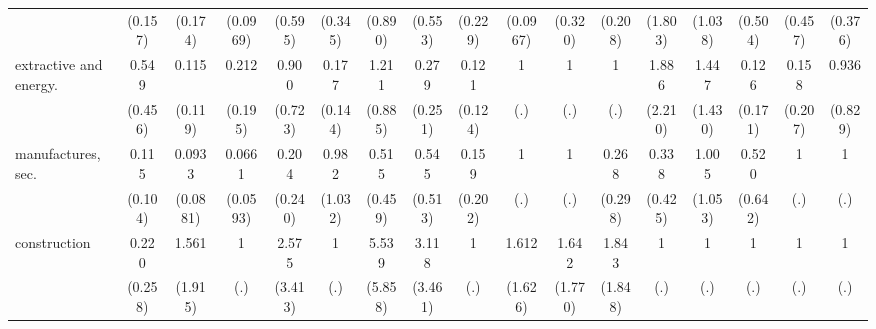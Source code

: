 {\begin{tabular}{l*{16}{c}}
                    &     (0.157)         &     (0.174)         &    (0.0969)         &     (0.595)         &     (0.345)         &     (0.890)         &     (0.553)         &     (0.229)         &    (0.0967)         &     (0.320)         &     (0.208)         &     (1.803)         &     (1.038)         &     (0.504)         &     (0.457)         &     (0.376)         \\
[1em]
extractive and energy.&       0.549         &       0.115\sym{*}  &       0.212         &       0.900         &       0.177\sym{*}  &       1.211         &       0.279         &       0.121\sym{*}  &           1         &           1         &           1         &       1.886         &       1.447         &       0.126         &       0.158         &       0.936         \\
                    &     (0.456)         &     (0.119)         &     (0.195)         &     (0.723)         &     (0.144)         &     (0.885)         &     (0.251)         &     (0.124)         &         (.)         &         (.)         &         (.)         &     (2.210)         &     (1.430)         &     (0.171)         &     (0.207)         &     (0.829)         \\
[1em]
manufactures, sec.  &       0.115\sym{*}  &      0.0933\sym{*}  &      0.0661\sym{**} &       0.204         &       0.982         &       0.515         &       0.545         &       0.159         &           1         &           1         &       0.268         &       0.338         &       1.005         &       0.520         &           1         &           1         \\
                    &     (0.104)         &    (0.0881)         &    (0.0593)         &     (0.240)         &     (1.032)         &     (0.459)         &     (0.513)         &     (0.202)         &         (.)         &         (.)         &     (0.298)         &     (0.425)         &     (1.053)         &     (0.642)         &         (.)         &         (.)         \\
[1em]
construction        &       0.220         &       1.561         &           1         &       2.575         &           1         &       5.539         &       3.118         &           1         &       1.612         &       1.642         &       1.843         &           1         &           1         &           1         &           1         &           1         \\
                    &     (0.258)         &     (1.915)         &         (.)         &     (3.413)         &         (.)         &     (5.858)         &     (3.461)         &         (.)         &     (1.626)         &     (1.770)         &     (1.848)         &         (.)         &         (.)         &         (.)         &         (.)         &         (.)         \\

\end{tabular}}
